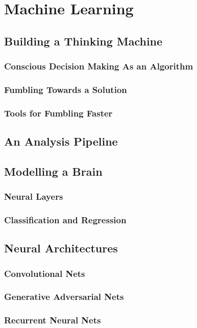 \chapter{Machine Learning}

\section{Building a Thinking Machine}

\subsection{Conscious Decision Making As an Algorithm}

\subsection{Fumbling Towards a Solution}

\subsection{Tools for Fumbling Faster}

\section{An Analysis Pipeline}

\section{Modelling a Brain}

\subsection{Neural Layers}

\subsection{Classification and Regression}

\section{Neural Architectures}

\subsection{Convolutional Nets}

\subsection{Generative Adversarial Nets}

\subsection{Recurrent Neural Nets}\label{sec:RNN}